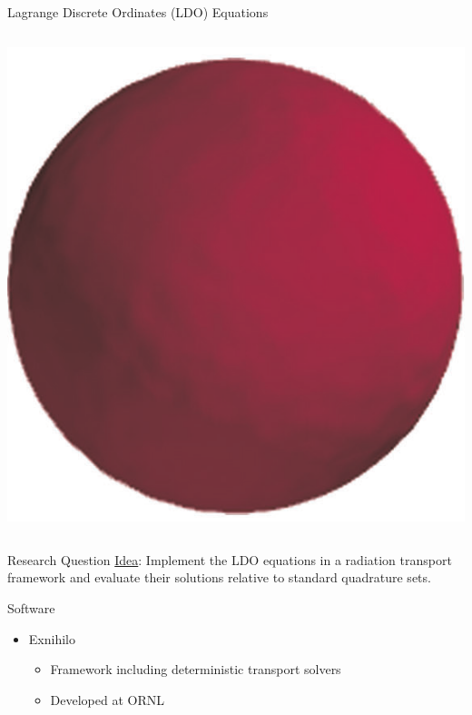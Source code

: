 \documentclass{beamer}
\begin{document}
\begin{frame}{Lagrange Discrete Ordinates (LDO) Equations \nocite{ahrens}}
\begin{columns}
\begin{column}{0.4\textwidth}
\includegraphics[width=\textwidth,natwidth=568,natheight=589]{img/ray-effects-fine-ldo.png}
\end{column}
\end{columns}
%
\end{frame}

\begin{frame}{Research Question}
%
\underline{Idea}: Implement the LDO equations in a radiation transport framework and
evaluate their solutions relative to standard quadrature sets.
%
\end{frame}

\begin{frame}{Software\nocite{denovo}}
%
\begin{itemize}
\item{Exnihilo}
\begin{itemize}
\item{Framework including deterministic transport solvers}
\item{Developed at ORNL}
\end{itemize}
\end{itemize}
%
\end{frame}
\end{document}
